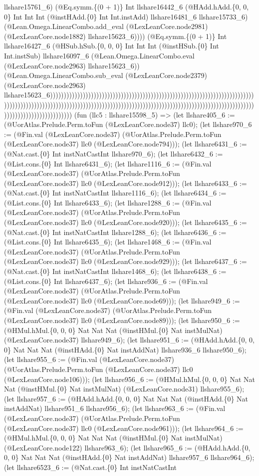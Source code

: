 \documentclass[11pt]{article}
\begin{document}
llshare15761\_6) (@Eq.symm.\{(0 + 1)\} Int llshare16442\_6 (@HAdd.hAdd.\{0, 0, 0\} Int Int Int (@instHAdd.\{0\} Int Int.instAdd) llshare16481\_6 llshare15733\_6) (@Lean.Omega.LinearCombo.add\_eval (@LexLeanCore.node2981) (@LexLeanCore.node1882) llshare15623\_6)))) (@Eq.symm.\{(0 + 1)\} Int llshare16427\_6 (@HSub.hSub.\{0, 0, 0\} Int Int Int (@instHSub.\{0\} Int Int.instSub) llshare16097\_6 (@Lean.Omega.LinearCombo.eval (@LexLeanCore.node2963) llshare15623\_6)) (@Lean.Omega.LinearCombo.sub\_eval (@LexLeanCore.node2379) (@LexLeanCore.node2963) llshare15623\_6)))))))))))))))))))))))))))))))))))))))))))))))))))))))))))))))))))))))))))))))))))))))))))))))))))))))))))))))))))))))))))))))))))))))))))))))))))))))))))))))))))))))))))))))))))))))))))))))) (fun (llc5 : llshare15598\_5) => (let llshare405\_6 := (@UorAtlas.Prelude.Perm.toFun (@LexLeanCore.node37) llc0); (let llshare970\_6 := (@Fin.val (@LexLeanCore.node37) (@UorAtlas.Prelude.Perm.toFun (@LexLeanCore.node37) llc0 (@LexLeanCore.node794))); (let llshare6431\_6 := (@Nat.cast.\{0\} Int instNatCastInt llshare970\_6); (let llshare6432\_6 := (@List.cons.\{0\} Int llshare6431\_6); (let llshare1116\_6 := (@Fin.val (@LexLeanCore.node37) (@UorAtlas.Prelude.Perm.toFun (@LexLeanCore.node37) llc0 (@LexLeanCore.node912))); (let llshare6433\_6 := (@Nat.cast.\{0\} Int instNatCastInt llshare1116\_6); (let llshare6434\_6 := (@List.cons.\{0\} Int llshare6433\_6); (let llshare1288\_6 := (@Fin.val (@LexLeanCore.node37) (@UorAtlas.Prelude.Perm.toFun (@LexLeanCore.node37) llc0 (@LexLeanCore.node920))); (let llshare6435\_6 := (@Nat.cast.\{0\} Int instNatCastInt llshare1288\_6); (let llshare6436\_6 := (@List.cons.\{0\} Int llshare6435\_6); (let llshare1468\_6 := (@Fin.val (@LexLeanCore.node37) (@UorAtlas.Prelude.Perm.toFun (@LexLeanCore.node37) llc0 (@LexLeanCore.node929))); (let llshare6437\_6 := (@Nat.cast.\{0\} Int instNatCastInt llshare1468\_6); (let llshare6438\_6 := (@List.cons.\{0\} Int llshare6437\_6); (let llshare936\_6 := (@Fin.val (@LexLeanCore.node37) (@UorAtlas.Prelude.Perm.toFun (@LexLeanCore.node37) llc0 (@LexLeanCore.node69))); (let llshare949\_6 := (@Fin.val (@LexLeanCore.node37) (@UorAtlas.Prelude.Perm.toFun (@LexLeanCore.node37) llc0 (@LexLeanCore.node89))); (let llshare950\_6 := (@HMul.hMul.\{0, 0, 0\} Nat Nat Nat (@instHMul.\{0\} Nat instMulNat) (@LexLeanCore.node37) llshare949\_6); (let llshare951\_6 := (@HAdd.hAdd.\{0, 0, 0\} Nat Nat Nat (@instHAdd.\{0\} Nat instAddNat) llshare936\_6 llshare950\_6); (let llshare955\_6 := (@Fin.val (@LexLeanCore.node37) (@UorAtlas.Prelude.Perm.toFun (@LexLeanCore.node37) llc0 (@LexLeanCore.node106))); (let llshare956\_6 := (@HMul.hMul.\{0, 0, 0\} Nat Nat Nat (@instHMul.\{0\} Nat instMulNat) (@LexLeanCore.node31) llshare955\_6); (let llshare957\_6 := (@HAdd.hAdd.\{0, 0, 0\} Nat Nat Nat (@instHAdd.\{0\} Nat instAddNat) llshare951\_6 llshare956\_6); (let llshare963\_6 := (@Fin.val (@LexLeanCore.node37) (@UorAtlas.Prelude.Perm.toFun (@LexLeanCore.node37) llc0 (@LexLeanCore.node961))); (let llshare964\_6 := (@HMul.hMul.\{0, 0, 0\} Nat Nat Nat (@instHMul.\{0\} Nat instMulNat) (@LexLeanCore.node122) llshare963\_6); (let llshare965\_6 := (@HAdd.hAdd.\{0, 0, 0\} Nat Nat Nat (@instHAdd.\{0\} Nat instAddNat) llshare957\_6 llshare964\_6); (let llshare6523\_6 := (@Nat.cast.\{0\} Int instNatCastInt 
\end{document}
